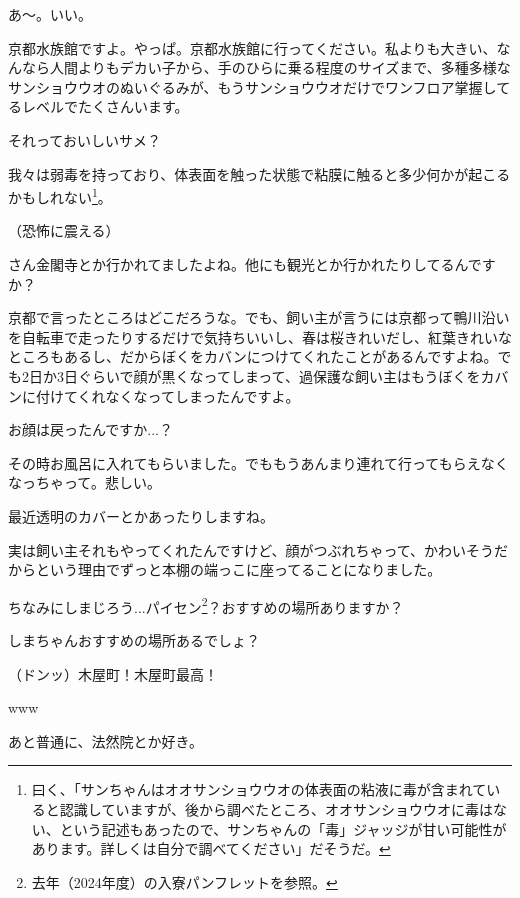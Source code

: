 \documentclass[9pt,4aj]{jsarticle}
\begin{document}
\begin{multicols}{2}
あ～。いい。

京都水族館ですよ。やっぱ。京都水族館に行ってください。私よりも大きい、なんなら人間よりもデカい子から、手のひらに乗る程度のサイズまで、多種多様なサンショウウオのぬいぐるみが、もうサンショウウオだけでワンフロア掌握してるレベルでたくさんいます。

それっておいしいサメ？

我々は弱毒を持っており、体表面を触った状態で粘膜に触ると多少何かが起こるかもしれない\footnote{曰く、「サンちゃんはオオサンショウウオの体表面の粘液に毒が含まれていると認識していますが、後から調べたところ、オオサンショウウオに毒はない、という記述もあったので、サンちゃんの「毒」ジャッジが甘い可能性があります。詳しくは自分で調べてください」だそうだ。}。

（恐怖に震える）

さん金閣寺とか行かれてましたよね。他にも観光とか行かれたりしてるんですか？

京都で言ったところはどこだろうな。でも、飼い主が言うには京都って鴨川沿いを自転車で走ったりするだけで気持ちいいし、春は桜きれいだし、紅葉きれいなところもあるし、だからぼくをカバンにつけてくれたことがあるんですよね。でも2日か3日ぐらいで顔が黒くなってしまって、過保護な飼い主はもうぼくをカバンに付けてくれなくなってしまったんですよ。

お顔は戻ったんですか...？

その時お風呂に入れてもらいました。でももうあんまり連れて行ってもらえなくなっちゃって。悲しい。

最近透明のカバーとかあったりしますね。

実は飼い主それもやってくれたんですけど、顔がつぶれちゃって、かわいそうだからという理由でずっと本棚の端っこに座ってることになりました。

ちなみにしまじろう...パイセン\footnote{去年（2024年度）の入寮パンフレットを参照。}？おすすめの場所ありますか？

しまちゃんおすすめの場所あるでしょ？

{\large （ドンッ）木屋町！木屋町最高！}

www

あと普通に、法然院とか好き。


\end{multicols}
\end{document}
